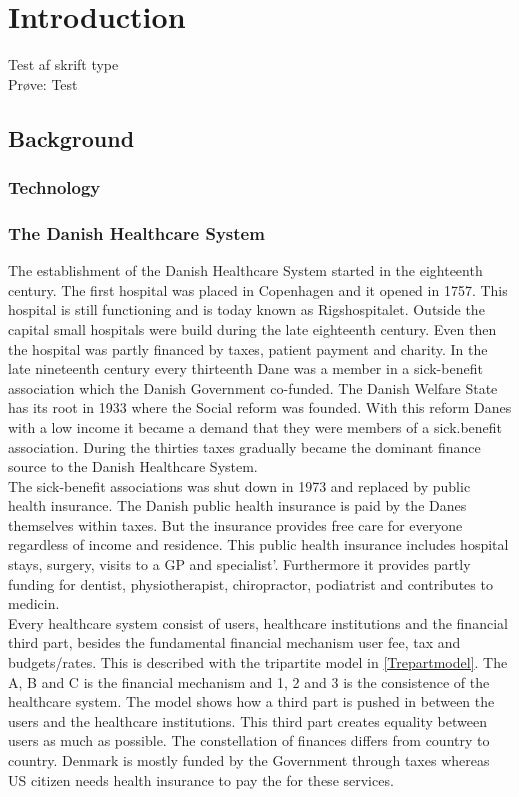 \chapter{Introduction}


Test af skrift type \\
Prøve: \cite{example} Test

\section{Background}
\subsection{Technology}
\subsection{The Danish Healthcare System}



The establishment of the Danish Healthcare System started in the eighteenth century. The first hospital was placed in Copenhagen and it opened in 1757. This hospital is still functioning and is today known as Rigshospitalet. Outside the capital small hospitals were build during the late eighteenth century. Even then the hospital was partly financed by taxes, patient payment and charity. In the late nineteenth century every thirteenth Dane was a member in a sick-benefit association which the Danish Government co-funded. The Danish Welfare State has its root in 1933 where the Social reform was founded. With this reform Danes with a low income it became a demand that they were members of a sick.benefit association. During the thirties taxes gradually became the dominant finance source to the Danish Healthcare System.\\ 
The sick-benefit associations was shut down in 1973 and replaced by public health insurance. The Danish public health insurance is paid by the Danes themselves within taxes. But the insurance provides free care for everyone regardless of  income and residence. This public health insurance includes hospital stays, surgery, visits to a GP and specialist'. Furthermore it provides partly funding for dentist, physiotherapist, chiropractor, podiatrist and contributes to medicin.   \\
Every healthcare system consist of users, healthcare institutions and the financial third part, besides the fundamental financial mechanism user fee, tax and budgets/rates. This is described with the tripartite model in \cref{Trepartmodel}. The A, B and C is the financial mechanism and 1, 2 and 3 is the consistence of the healthcare system. The model shows how a third part is pushed in between the users and the healthcare institutions. This third part creates equality between users as much as possible. The constellation of finances differs from country to country. Denmark is mostly funded by the Government through taxes whereas US citizen needs health insurance to pay the for these services. \\
 

